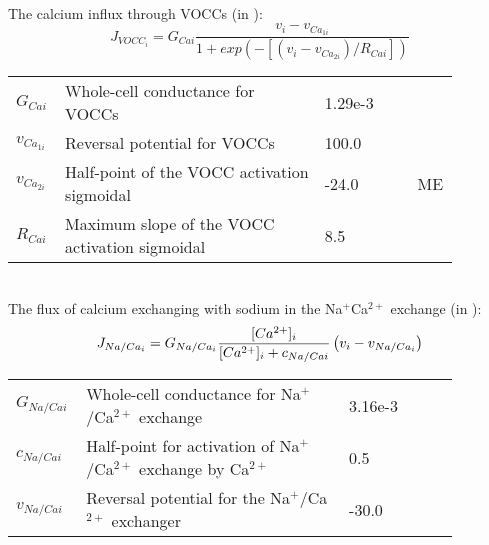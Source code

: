\\
%
\newpage
The calcium influx through VOCCs (in \uMs): 
\begin{equation} \label{eq:JVOCCi}
J_{VOCC_{i}} = G_{Cai} \frac{v_{i}-v_{Ca_{1i}}}     {1+ exp(-\left[ \left(  v_{i}-v_{Ca_{2i}}\right) /R_{Cai}      \right] )}
\end{equation}
\begin{table}[h!]
\centering
\begin{tabular}{| p{0.09\linewidth} | >{\footnotesize} p{0.57\linewidth} | >{\footnotesize} p{0.2\linewidth} | >{\footnotesize} p{0.02\linewidth} |}
\arrayrulecolor{lightgrey}\hline
$G_{Cai}$      	& Whole-cell conductance for VOCCs	 					& 1.29e-3  \uMpmVs					& \cite{Koenigsberger2006} \\
$v_{Ca_{1i}}$   & Reversal potential for VOCCs	 						& 100.0 \mV							& \cite{Koenigsberger2006} \\
$v_{Ca_{2i}}$  	& Half-point of the VOCC activation sigmoidal		 	& -24.0 \mV							& ME \\
$R_{Cai}$      	& Maximum slope of the VOCC	activation sigmoidal		& 8.5 \mV							& \cite{Koenigsberger2006} \\
\hline
\end{tabular}
\label{tab:JVOCCi}
\end{table}
\\
%
The flux of calcium exchanging with sodium in the Na$^{+}$Ca$^{2+}$ exchange (in \uMs): 
\begin{equation} \label{eq:JNaCai}
J_{Na/Ca_{i}} = G_{Na/Ca_{i}} \frac{[Ca^{2+}]_{i}}     {[Ca^{2+}]_{i} + c_{Na/Cai}} \left( v_{i}-v_{Na/Ca_{i}} \right)
\end{equation}
%
\begin{table}[h!]
\centering
\begin{tabular}{| p{0.09\linewidth} | >{\footnotesize} p{0.57\linewidth} | >{\footnotesize} p{0.2\linewidth} | >{\footnotesize} p{0.02\linewidth} |}
\arrayrulecolor{lightgrey}\hline
$G_{Na/Cai}$   	& Whole-cell conductance for Na$^{+}$/Ca$^{2+}$ exchange			 		 & 3.16e-3 \uMpmVs	& \cite{Koenigsberger2005} \\
$c_{Na/Cai}$   	& Half-point for activation of Na$^{+}$/Ca$^{2+}$ exchange by Ca$^{2+}$		 & 0.5 \uM			& \cite{Koenigsberger2006} \\
$v_{Na/Cai}$   	& Reversal potential for the Na$^{+}$/Ca$^{2+}$ exchanger					 & -30.0 \mV		& \cite{Koenigsberger2006} \\
\hline
\end{tabular}
\label{tab:JNaCai}
\end{table}

